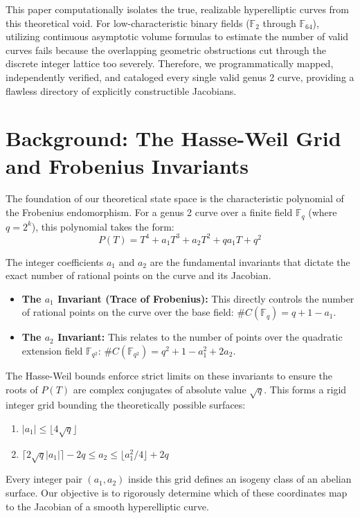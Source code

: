 \documentclass[12pt]{article}
\begin{document}
This paper computationally isolates the true, realizable hyperelliptic curves from this theoretical void. For low-characteristic binary fields ($\mathbb{F}_2$ through $\mathbb{F}_{64}$), utilizing continuous asymptotic volume formulas to estimate the number of valid curves fails because the overlapping geometric obstructions cut through the discrete integer lattice too severely. Therefore, we programmatically mapped, independently verified, and cataloged every single valid genus 2 curve, providing a flawless directory of explicitly constructible Jacobians.

\section{Background: The Hasse-Weil Grid and Frobenius Invariants}
The foundation of our theoretical state space is the characteristic polynomial of the Frobenius endomorphism. For a genus 2 curve over a finite field $\mathbb{F}_q$ (where $q = 2^k$), this polynomial takes the form:
\[ P(T) = T^4 + a_1 T^3 + a_2 T^2 + q a_1 T + q^2 \]

The integer coefficients $a_1$ and $a_2$ are the fundamental invariants that dictate the exact number of rational points on the curve and its Jacobian. 
\begin{itemize}
    \item \textbf{The $a_1$ Invariant (Trace of Frobenius):} This directly controls the number of rational points on the curve over the base field: $\#C(\mathbb{F}_q) = q + 1 - a_1$.
    \item \textbf{The $a_2$ Invariant:} This relates to the number of points over the quadratic extension field $\mathbb{F}_{q^2}$: $\#C(\mathbb{F}_{q^2}) = q^2 + 1 - a_1^2 + 2a_2$.
\end{itemize}

The Hasse-Weil bounds enforce strict limits on these invariants to ensure the roots of $P(T)$ are complex conjugates of absolute value $\sqrt{q}$. This forms a rigid integer grid bounding the theoretically possible surfaces:
\begin{enumerate}
    \item $|a_1| \le \lfloor 4\sqrt{q} \rfloor$
    \item $\lceil 2\sqrt{q}|a_1| \rceil - 2q \le a_2 \le \lfloor a_1^2/4 \rfloor + 2q$
\end{enumerate}
Every integer pair $(a_1, a_2)$ inside this grid defines an isogeny class of an abelian surface. Our objective is to rigorously determine which of these coordinates map to the Jacobian of a smooth hyperelliptic curve.
\end{document}
